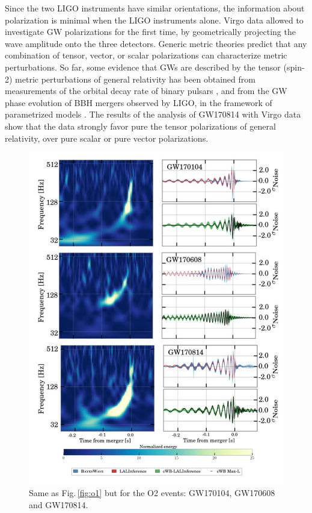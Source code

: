 \documentclass[binding=0.6cm, LaM]{sapthesis}
\begin{document}
	Since the two LIGO instruments have similar orientations, 
	the information about polarization is minimal when the LIGO instruments alone.  
	Virgo data allowed to investigate GW polarizations for the first time, by geometrically 
	projecting the wave amplitude onto the three detectors.
	Generic metric theories predict that any combination of tensor, vector, or scalar 
	polarizations \cite{171,172} can characterize metric perturbations.
	So far, some evidence that GWs are described by the tensor (spin-2) metric perturbations 
	of general relativity has been obtained from measurements of the orbital decay rate of binary pulsars \cite{173,176}, 
	and from the GW phase evolution of BBH mergers observed by LIGO, in the framework of parametrized models \cite{52,57,60}. 
	The results of the analysis of GW170814 with Virgo data show that the data strongly favor
	pure the tensor polarizations of general relativity, over pure scalar or pure vector polarizations.

        \begin{figure}[!t]
          \label{o2}
          \includegraphics[scale=0.45]{o2}
          \centering
          \caption{Same as Fig.\,\ref{fig:o1} but for the O2 events: GW170104, GW170608 and GW170814.}
          \label{fig:o2}
        \end{figure}
\end{document}
